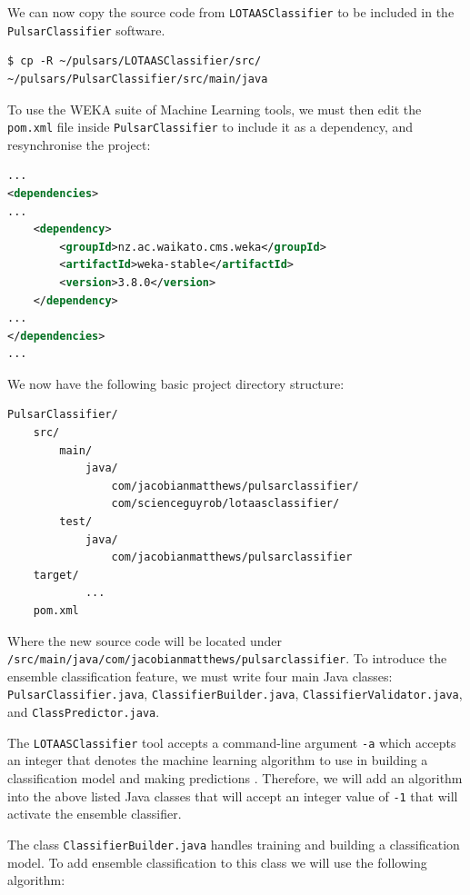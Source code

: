 \documentclass{article}
\begin{document}
We can now copy the source code from \verb|LOTAASClassifier| to be included in the \verb|PulsarClassifier| software.

\begin{lstlisting}[numbers=none]
$ cp -R ~/pulsars/LOTAASClassifier/src/ ~/pulsars/PulsarClassifier/src/main/java
\end{lstlisting}

To use the WEKA suite of Machine Learning tools, we must then edit the \verb|pom.xml| file inside \verb|PulsarClassifier| to include it as a dependency, and resynchronise the project:\\

\begin{lstlisting}[numbers=none, title=pom.xml, language=xml]
...
<dependencies>
...
    <dependency>
        <groupId>nz.ac.waikato.cms.weka</groupId>
        <artifactId>weka-stable</artifactId>
        <version>3.8.0</version>
    </dependency>
...
</dependencies>
...
\end{lstlisting}

We now have the following basic project directory structure:

\begin{lstlisting}[numbers=none]
PulsarClassifier/
    src/
        main/
            java/
                com/jacobianmatthews/pulsarclassifier/
                com/scienceguyrob/lotaasclassifier/
        test/
            java/
                com/jacobianmatthews/pulsarclassifier
    target/
            ...
    pom.xml
\end{lstlisting}

Where the new source code will be located under \\\verb|/src/main/java/com/jacobianmatthews/pulsarclassifier|. To introduce the ensemble classification feature, we must write four main Java classes: \\\verb|PulsarClassifier.java|,  \verb|ClassifierBuilder.java|,  \verb|ClassifierValidator.java|,  and \verb|ClassPredictor.java|.

The \verb|LOTAASClassifier| tool accepts a command-line argument \verb|-a| which accepts an integer that denotes the machine learning algorithm to use in building a classification model and making predictions \autocite{lyon}. Therefore, we will add an algorithm into the above listed Java classes that will accept an integer value of \verb|-1| that will activate the ensemble classifier.

The class \verb|ClassifierBuilder.java| handles training and building a classification model. To add ensemble classification to this class we will use the following algorithm:
\end{document}

